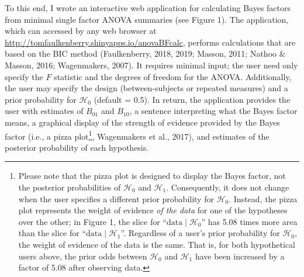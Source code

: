 \documentclass[doc]{apa6}
\begin{document}
To this end, I wrote an interactive web application for calculating Bayes factors from minimal single factor ANOVA summaries (see Figure 1). The application, which can accessed by any web browser at \url{http://tomfaulkenberry.shinyapps.io/anovaBFcalc}, performs calculations that are based on the BIC method (Faulkenberry, 2018, 2019; Masson, 2011; Nathoo \& Masson, 2016; Wagenmakers, 2007). It requires minimal input; the user need only specify the \(F\) statistic and the degrees of freedom for the ANOVA. Additionally, the user may specify the design (between-subjects or repeated measures) and a prior probability for \(\mathcal{H}_0\) (default = 0.5). In return, the application provides the user with estimates of \(B_{01}\) and \(B_{10}\), a sentence interpreting what the Bayes factor means, a graphical display of the strength of evidence provided by the Bayes factor (i.e., a pizza plot\footnote{Please note that the pizza plot is designed to display the Bayes factor, not the posterior probabilities of $\mathcal{H}_0$ and $\mathcal{H}_1$. Consequently, it does not change when the user specifies a different prior probability for \(\mathcal{H}_0\). Instead, the pizza plot represents the weight of evidence {\it of the data} for one of the hypotheses over the other; in Figure 1, the slice for ``$\text{data}\mid \mathcal{H}_0$'' has 5.08 times more area than the slice for ``$\text{data}\mid \mathcal{H}_1$''. Regardless of a user's prior probability for \(\mathcal{H}_0\), the weight of evidence of the data is the same. That is, for both hypothetical users above, the prior odds between \(\mathcal{H}_0\) and \(\mathcal{H}_1\) have been increased by a factor of 5.08 after observing data.}, Wagenmakers et al., 2017), and estimates of the posterior probability of each hypothesis.
\end{document}
